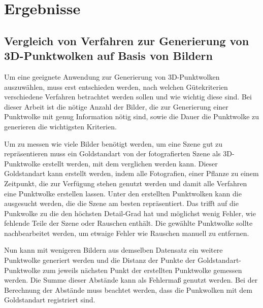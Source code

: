 \documentclass[12pt,titlepage, twoside]{article}
\begin{document}
\newpage
\section{Ergebnisse}
\label{sec:ergebnisse}
%

\subsection{Vergleich von Verfahren zur Generierung von 3D-Punktwolken auf Basis von Bildern}

Um eine geeignete Anwendung zur Generierung von 3D-Punktwolken auszuwählen, muss erst entschieden werden, nach welchen Gütekriterien verschiedene Verfahren betrachtet werden sollen und wie wichtig diese sind.
Bei dieser Arbeit ist die nötige Anzahl der Bilder, die zur Generierung einer Punktwolke mit genug Information nötig sind, sowie die Dauer die Punktwolke zu generieren die wichtigsten Kriterien.

Um zu messen wie viele Bilder benötigt werden, um eine Szene gut zu repräsentieren muss ein Goldstandart von der fotografierten Szene als 3D-Punktwolke erstellt werden, mit dem verglichen werden kann.
Dieser Goldstandart kann erstellt werden, indem alle Fotografien, einer Pflanze zu einem Zeitpunkt, die zur Verfügung stehen genutzt werden und damit alle Verfahren eine Punktwolke erstellen lassen. 
Unter den erstellten Punktwolken kann die ausgesucht werden, die die Szene am besten repräsentiert. 
Das trifft auf die Punkwolke zu die den höchsten Detail-Grad hat und möglichst wenig Fehler, wie fehlende Teile der Szene oder Rauschen enthält.
Die gewählte Punktwolke sollte nachbearbeitet werden, um etwaige Fehler wie Rauschen manuell zu entfernen.

Nun kann mit wenigeren Bildern aus demselben Datensatz ein weitere Punktwolke generiert werden und die Distanz der Punkte der Goldstandart-Punktwolke zum jeweils nächsten Punkt der erstellten Punktwolke gemessen werden.
Die Summe dieser Abstände kann als Fehlermaß genutzt werden. Bei der Berechnung der Abstände muss beachtet werden, dass die Punkwolken mit dem Goldstandart registriert sind.
\end{document}
